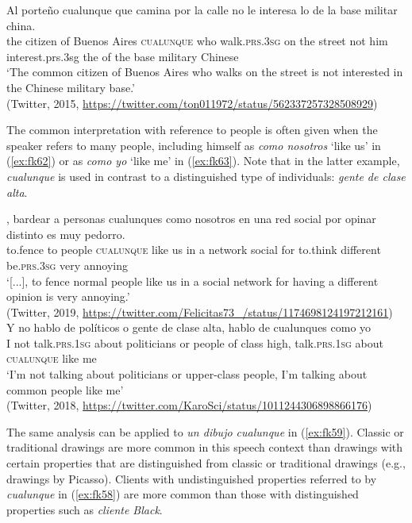 \documentclass[output=paper,colorlinks,citecolor=brown]{langscibook}
\begin{document}
\ea \label{ex:fk61}
    \gll Al porteño cualunque que camina por la calle no le interesa lo de la base militar china.\\
    the {citizen of Buenos Aires} \textsc{cualunque}  who walk.\textsc{prs.3sg} on the street not him interest.{prs.3sg} the of the base military Chinese \\
   \glt ‘The common citizen of Buenos Aires who walks on the street is not interested in the Chinese military base.’\\
    (Twitter, 2015, \url{https://twitter.com/ton011972/status/562337257328508929})\\
\z

The common interpretation with reference to people is often given when the speaker refers to many people, including himself as \textit{como nosotros} ‘like us’ in (\ref{ex:fk62}) or as \textit{como yo} ‘like me’ in (\ref{ex:fk63}). Note that in the latter example, \textit{cualunque} is used in contrast to a distinguished type of individuals: \textit{gente de clase alta}.

\ea \label{ex:fk62}
    \gll [...], bardear a personas cualunques como nosotros en una red social por opinar distinto es muy pedorro.\\
    {} to.fence to people \textsc{cualunque} like us in a network social for to.think different be.\textsc{prs.3sg} very annoying\\
    \glt ‘[...], to fence normal people like us in a social network for having a different opinion is very annoying.’\\
    (Twitter, 2019, \url{https://twitter.com/Felicitas73_/status/1174698124197212161})\\
    
    \ex \label{ex:fk63}
    \gll Y no hablo de políticos o gente de clase alta, hablo de cualunques como yo\\
    I not talk.\textsc{prs.1sg} about politicians or people of class high, talk.\textsc{prs.1sg} about \textsc{cualunque} like me\\
    \glt ‘I’m not talking about politicians or upper-class people, I’m talking about common people like me’\\
    (Twitter, 2018, \url{https://twitter.com/KaroSci/status/1011244306898866176})\\
\z

The same analysis can be applied to \textit{un dibujo cualunque} in (\ref{ex:fk59}). Classic or traditional drawings are more common in this speech context than drawings with certain properties that are distinguished from classic or traditional drawings (e.g., drawings by Picasso). Clients with undistinguished properties referred to by \textit{cualunque} in (\ref{ex:fk58}) are more common than those with distinguished properties such as \textit{cliente Black}.
\end{document}

